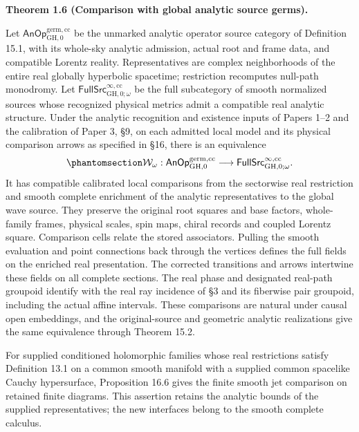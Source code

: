 \documentclass[
  english,
  11pt,
  reqno]{amsart}
\makeatletter
\newcommand{\pandocstatementheading}[1]{%
  \par\addpenalty{\@beginparpenalty}%
  \addvspace{.5\baselineskip plus .2\baselineskip minus .2\baselineskip}%
  {\normalfont\bfseries #1\par}%
  \nobreak\@afterindenttrue\@afterheading
}
\makeatother
\begin{document}
\pandocstatementheading{\protect{}\label{thm:global-analytic-comparison-overview}Theorem 1.6 (Comparison with global analytic source germs).}

Let \(\mathsf{AnOp}^{\mathrm{germ},\mathrm{cc}}_{\mathrm{GH},0}\) be the
unmarked analytic operator source category of Definition 15.1, with its
whole-sky analytic admission, actual root and frame data, and compatible
Lorentz reality. Representatives are complex neighborhoods of the entire
real globally hyperbolic spacetime; restriction recomputes null-path
monodromy. Let
\(\mathsf{FullSrc}^{\infty,\mathrm{cc}}_{\mathrm{GH},0;\omega}\) be the
full subcategory of smooth normalized sources whose recognized physical
metrics admit a compatible real analytic structure. Under the analytic
recognition and existence inputs of Papers 1--2 and the calibration of
Paper 3, §9, on each admitted local model and its physical comparison
arrows as specified in §16, there is an equivalence
\begin{equation}\protect\phantomsection\label{eq:global-analytic-comparison-overview}{
\mathcal W_\omega:
\mathsf{AnOp}^{\mathrm{germ},\mathrm{cc}}_{\mathrm{GH},0}
\longrightarrow
\mathsf{FullSrc}^{\infty,\mathrm{cc}}_{\mathrm{GH},0;\omega}.
}\end{equation} It has compatible calibrated local comparisons from the
sectorwise real restriction and smooth complete enrichment of the
analytic representatives to the global wave source. They preserve the
original root squares and base factors, whole-family frames, physical
scales, spin maps, chiral records and coupled Lorentz square. Comparison
cells relate the stored associators. Pulling the smooth evaluation and
point connections back through the vertices defines the full fields on
the enriched real presentation. The corrected transitions and arrows
intertwine these fields on all complete sections. The real phase and
designated real-path groupoid identify with the real ray incidence of §3
and its fiberwise pair groupoid, including the actual affine intervals.
These comparisons are natural under causal open embeddings, and the
original-source and geometric analytic realizations give the same
equivalence through Theorem 15.2.

For supplied conditioned holomorphic families whose real restrictions
satisfy Definition 13.1 on a common smooth manifold with a supplied
common spacelike Cauchy hypersurface, Proposition 16.6 gives the finite
smooth jet comparison on retained finite diagrams. This assertion
retains the analytic bounds of the supplied representatives; the new
interfaces belong to the smooth complete calculus.
\end{document}
